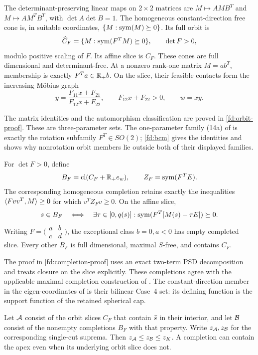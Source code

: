 \begin{proposition}\label{fd:orbit}
The determinant-preserving linear maps on $2\times2$ matrices are
$M\mapsto AMB^T$ and $M\mapsto AM^TB^T$, with
$\det A\det B=1$. The homogeneous constant-direction free cone is,
in suitable coordinates, $\{M:\operatorname{sym}(M)\succeq0\}$. Its full orbit is
\[
 \widehat C_F=\{M:\operatorname{sym}(F^TM)\succeq0\},\qquad\det F>0,
\]
modulo positive scaling of $F$. Its affine slice is $C_F$.
These cones are full dimensional and determinant-free. At a nonzero
rank-one matrix $M=ab^T$, membership is exactly
$F^Ta\in\mathbb R_+b$. On the slice, their feasible contacts form the increasing
Möbius graph
\[
 y=\frac{F_{11}x+F_{21}}{F_{12}x+F_{22}},\qquad
 F_{12}x+F_{22}>0,\qquad w=xy.
\]
\end{proposition}
The matrix identities and the automorphism classification are proved in
\cref{fd:orbit-proof}. These are three-parameter sets. The one-parameter
family (14a) of \citet{BCM2020} is exactly the rotation subfamily
$F^T\in SO(2)$; \cref{fd:bcm} gives the identities and shows why
nonrotation orbit members lie outside both of their displayed families.

\begin{proposition}\label{fd:completion}
For $\det F>0$, define
\[
 B_F=\operatorname{cl}(C_F+\mathbb R_+e_w),\qquad Z_F=\operatorname{sym}(F^TE).
\]
The corresponding homogeneous completion retains exactly the inequalities
$\langle Fvv^T,M\rangle\ge0$ for which $v^TZ_Fv\ge0$. On the affine slice,
\begin{equation}\label{fd:lowering}
 s\in B_F\quad\Longleftrightarrow\quad
 \exists\tau\in[0,q(s)]:\operatorname{sym}(F^T[M(s)-\tau E])\succeq0.
\end{equation}
Writing $F=\bigl(\begin{smallmatrix}a&b\\c&d\end{smallmatrix}\bigr)$,
the exceptional class $b=0,a<0$ has empty completed slice. Every other
$B_F$ is full dimensional, maximal $S$-free, and contains $C_F$.
\end{proposition}
The proof in \cref{fd:completion-proof} uses an exact two-term PSD
decomposition and treats closure on the slice explicitly. These
completions agree with the applicable maximal completion construction
of \citet{MPS2026}. The constant-direction member in the eigen-coordinates
of \citet{ChmielaMunozSerrano2020ZIB} is their bilinear Case~4 set: its defining function
is the support function of the retained spherical cap.

Let $\mathcal A$ consist of the orbit slices $C_F$ that contain $\bar s$ in
their interior, and let $\mathcal B$ consist of the nonempty completions
$B_F$ with that property. Write $z_{\mathcal A},z_{\mathcal B}$ for the corresponding
single-cut suprema. Then $z_{\mathcal A}\le z_{\mathcal B}\le z_K$. A completion can contain
the apex even when its underlying orbit slice does not.

